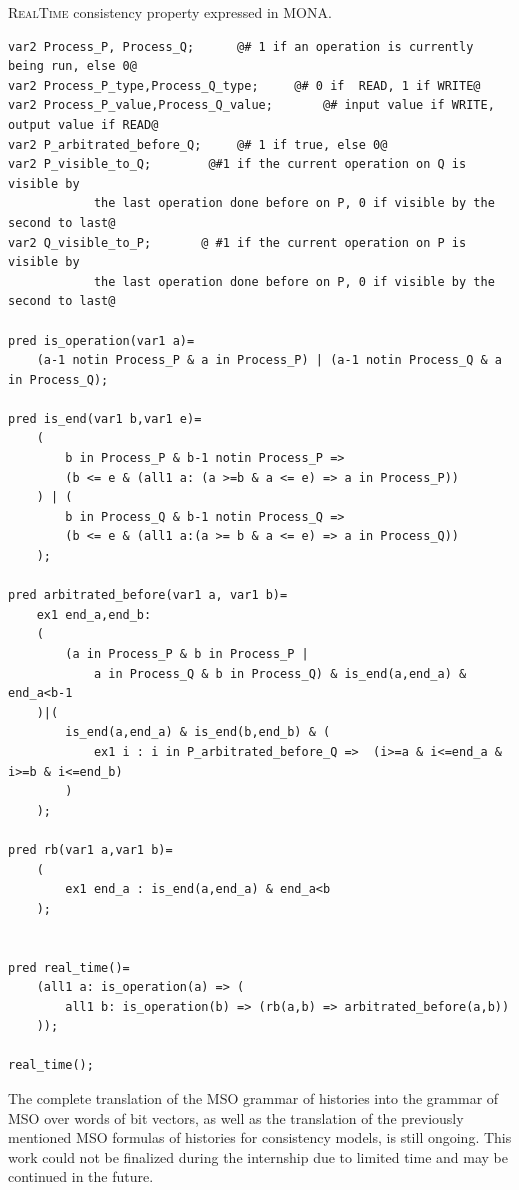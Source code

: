 \documentclass[12pt]{article}
\begin{document}

\begin{example}

\textsc{RealTime} consistency property expressed in MONA.
\small
\begin{lstlisting}
var2 Process_P, Process_Q;      @# 1 if an operation is currently being run, else 0@
var2 Process_P_type,Process_Q_type;     @# 0 if  READ, 1 if WRITE@
var2 Process_P_value,Process_Q_value;       @# input value if WRITE, output value if READ@
var2 P_arbitrated_before_Q;     @# 1 if true, else 0@
var2 P_visible_to_Q;        @#1 if the current operation on Q is visible by
			the last operation done before on P, 0 if visible by the second to last@
var2 Q_visible_to_P;       @ #1 if the current operation on P is visible by
			the last operation done before on P, 0 if visible by the second to last@

pred is_operation(var1 a)=
    (a-1 notin Process_P & a in Process_P) | (a-1 notin Process_Q & a in Process_Q);

pred is_end(var1 b,var1 e)=
    (
        b in Process_P & b-1 notin Process_P => 
        (b <= e & (all1 a: (a >=b & a <= e) => a in Process_P))
    ) | (
        b in Process_Q & b-1 notin Process_Q => 
        (b <= e & (all1 a:(a >= b & a <= e) => a in Process_Q))
    );

pred arbitrated_before(var1 a, var1 b)=
    ex1 end_a,end_b:
    (
        (a in Process_P & b in Process_P | 
        	a in Process_Q & b in Process_Q) & is_end(a,end_a) & end_a<b-1
    )|(
        is_end(a,end_a) & is_end(b,end_b) & (
            ex1 i : i in P_arbitrated_before_Q =>  (i>=a & i<=end_a & i>=b & i<=end_b)
        )
    );

pred rb(var1 a,var1 b)=
    (
        ex1 end_a : is_end(a,end_a) & end_a<b
    );


pred real_time()=
    (all1 a: is_operation(a) => (
        all1 b: is_operation(b) => (rb(a,b) => arbitrated_before(a,b))
    ));
    
real_time();
\end{lstlisting}


\end{example}

The complete translation of the MSO grammar of histories into the grammar of MSO over words of bit vectors, as well as the translation of the previously mentioned MSO formulas of histories for consistency models, is still ongoing. This work could not be finalized during the internship due to limited time and may be continued in the future.
\end{document}
